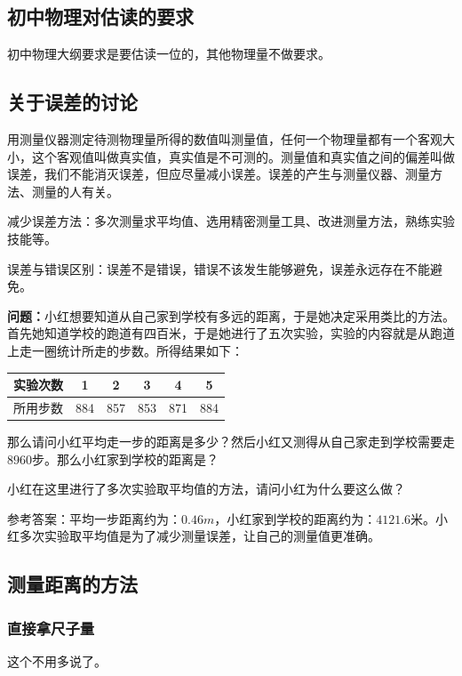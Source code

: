 \documentclass[12pt]{exam}%
\begin{document}
\begin{knowledge}
\subsection{初中物理对估读的要求}
初中物理大纲要求是要估读一位的，其他物理量不做要求。


\subsection{关于误差的讨论}
用测量仪器测定待测物理量所得的数值叫测量值，任何一个物理量都有一个客观大小，这个客观值叫做真实值，真实值是不可测的。测量值和真实值之间的偏差叫做误差，我们不能消灭误差，但应尽量减小误差。误差的产生与测量仪器、测量方法、测量的人有关。

减少误差方法：多次测量求平均值、选用精密测量工具、改进测量方法，熟练实验技能等。

误差与错误区别：误差不是错误，错误不该发生能够避免，误差永远存在不能避免。


\textbf{问题：}小红想要知道从自己家到学校有多远的距离，于是她决定采用类比的方法。首先她知道学校的跑道有四百米，于是她进行了五次实验，实验的内容就是从跑道上走一圈统计所走的步数。所得结果如下：
\begin{table}[H]
\centering
\begin{tabular}{|p{8ex}|c|c|c|c|c|}
\hline 
实验次数 & 1 & 2 & 3 & 4 & 5 \\ 
\hline 
所用步数 & 884 & 857 & 853 & 871 & 884 \\ 
\hline 
\end{tabular} 
\end{table}
那么请问小红平均走一步的距离是多少？然后小红又测得从自己家走到学校需要走$8960$步。那么小红家到学校的距离是？

小红在这里进行了多次实验取平均值的方法，请问小红为什么要这么做？


\begin{solution}[10ex]
参考答案：平均一步距离约为：$0.46m$，小红家到学校的距离约为：$4121.6$米。小红多次实验取平均值是为了减少测量误差，让自己的测量值更准确。
\end{solution}



\subsection{测量距离的方法}
\subsubsection{直接拿尺子量}
这个不用多说了。


\end{knowledge}
\end{document}
